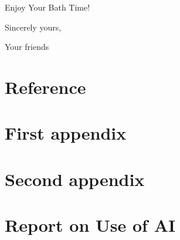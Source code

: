 \documentclass{mcmthesis}
\begin{document}
	\begin{letter}{Enjoy Your Bath Time!}
		
		
		\vspace{\parskip}
		
		Sincerely yours,
		
		Your friends
		
	\end{letter}
	
	
	
	
	
	
	
	
	
	
	\newpage
	\section*{Reference} %
	\printbibliography
	
	
	
	
	\begin{appendices}
		\section{First appendix}
		\section{Second appendix}
	\end{appendices}
	
	
	
	
	\newpage
	\setcounter{lastpage}{\value{page}}
	\thispagestyle{empty} 
	
	\section*{Report on Use of AI}
	
\end{document}

